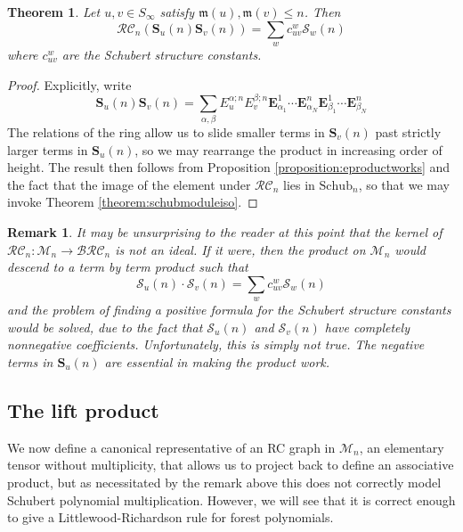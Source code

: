\documentclass[pdflatex,sn-mathphys-num]{sn-jnl}
\numberwithin{equation}{subsection}
\newcommand{\BRC}{\mathcal{BRC}}
\newcommand{\RC}{\mathcal{RC}}
\newcommand{\maxd}{\mathfrak{m}}
\theoremstyle{thmstyleone}
\newtheorem{theorem}{Theorem}[section]
\theoremstyle{thmstylethree}
\theoremstyle{thmstyletwo}
\newtheorem*{remark}{Remark}
\begin{document}
\begin{theorem} \label{theorem:schubproduct}
Let $u,v\in S_\infty$ satisfy $\maxd(u),\maxd(v)\leq n$. Then
$$\RC_n(\mathbf{S}_u(n)\mathbf{S}_v(n)) = \sum_{w} c_{uv}^w \mathcal{S}_w(n)$$
where $c_{uv}^w$ are the Schubert structure constants.
\end{theorem}
\begin{proof}
  Explicitly, write
  $$\mathbf{S}_u(n)\mathbf{S}_v(n) = \sum_{\alpha,\beta} E_u^{\alpha;n}E_v^{\beta;n} \mathbf{E}_{\alpha_1}^1 \cdots  \mathbf{E}_{\alpha_N}^n \mathbf{E}_{\beta_1}^1 \cdots  \mathbf{E}_{\beta_N}^n$$
  The relations of the ring allow us to slide smaller terms in $\mathbf{S}_v(n)$ past strictly larger terms in $\mathbf{S}_u(n)$, so we may rearrange the product in increasing order of height. The result then follows from Proposition \ref{proposition:eproductworks} and the fact that the image of the element under $\RC_n$ lies in $\mathrm{Schub}_n$, so that we may invoke Theorem \ref{theorem:schubmoduleiso}.
\end{proof}

\begin{remark}
It may be unsurprising to the reader at this point that the kernel of $\RC_n:\mathcal{M}_n\to \BRC_n$ \emph{is not an ideal}. If it were, then the product on $\mathcal{M}_n$ would descend to a term by term product such that
$$\mathcal{S}_u(n)\cdot \mathcal{S}_v(n) = \sum_{w} c_{uv}^w \mathcal{S}_w(n)$$
and the problem of finding a positive formula for the Schubert structure constants would be solved, due to the fact that $\mathcal{S}_u(n)$ and $\mathcal{S}_v(n)$ have completely nonnegative coefficients. Unfortunately, this is simply not true. The negative terms in $\mathbf{S}_u(n)$ are essential in making the product work.
\end{remark}


\subsection{The lift product}\label{section:liftproduct}

We now define a canonical representative of an RC graph in $\mathcal{M}_n$, an elementary tensor without multiplicity, that allows us to project back to define an associative product, but as necessitated by the remark above this does not correctly model Schubert polynomial multiplication. However, we will see that it is correct enough to give a Littlewood-Richardson rule for forest polynomials.
\end{document}
